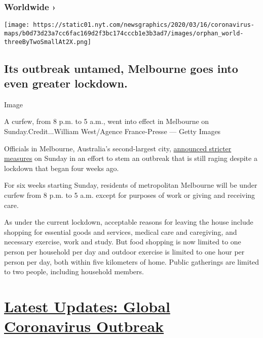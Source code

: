 \hypertarget{worldwide-}{%
\subsubsection{Worldwide ›}\label{worldwide-}}

\texttt{[image: https://static01.nyt.com/newsgraphics/2020/03/16/coronavirus-maps/b0d73d23a7cc6fac169d2f3bc174cccb1e3b3ad7/images/orphan\_world-threeByTwoSmallAt2X.png]}

\hypertarget{its-outbreak-untamed-melbourne-goes-into-even-greater-lockdown}{%
\subsection{Its outbreak untamed, Melbourne goes into even greater
lockdown.}\label{its-outbreak-untamed-melbourne-goes-into-even-greater-lockdown}}

Image

A curfew, from 8 p.m. to 5 a.m., went into effect in Melbourne on
Sunday.Credit...William West/Agence France-Presse --- Getty Images

Officials in Melbourne, Australia's second-largest city,
\href{https://www.premier.vic.gov.au/statement-changes-melbournes-restrictions}{announced
stricter measures} on Sunday in an effort to stem an outbreak that is
still raging despite a lockdown that began four weeks ago.

For six weeks starting Sunday, residents of metropolitan Melbourne will
be under curfew from 8 p.m. to 5 a.m. except for purposes of work or
giving and receiving care.

As under the current lockdown, acceptable reasons for leaving the house
include shopping for essential goods and services, medical care and
caregiving, and necessary exercise, work and study. But food shopping is
now limited to one person per household per day and outdoor exercise is
limited to one hour per person per day, both within five kilometers of
home. Public gatherings are limited to two people, including household
members.

\hypertarget{latest-updates-global-coronavirus-outbreak}{%
\section{\texorpdfstring{\href{https://www.nytimes.com/2020/08/04/world/coronavirus-cases.html?action=click\&pgtype=Article\&state=default\&region=MAIN_CONTENT_1\&context=storylines_live_updates}{Latest
Updates: Global Coronavirus
Outbreak}}{Latest Updates: Global Coronavirus Outbreak}}\label{latest-updates-global-coronavirus-outbreak}}

